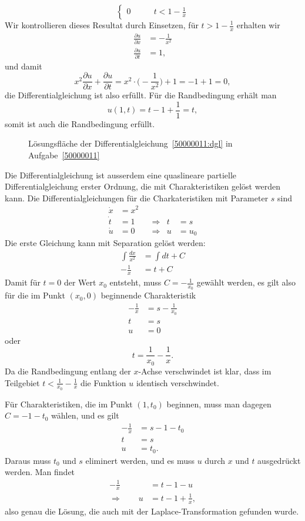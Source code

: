 \begin{loesung}
\[\begin{cases}
0
&\qquad t < 1-\frac1x
\end{cases}
\]
Wir kontrollieren dieses Resultat durch Einsetzen, für $t>1-\frac1x$
erhalten wir
\begin{align*}
\frac{\partial u}{\partial x}
&=-\frac1{x^2}
\\
\frac{\partial u}{\partial t}
&=1,
\end{align*}
und damit
\[
x^2\frac{\partial u}{\partial x}+\frac{\partial u}{\partial t}
=
x^2\cdot \biggl(-\frac1{x^2}\biggr) + 1 = -1 + 1=0,
\]
die Differentialgleichung ist also erfüllt.
Für die Randbedingung erhält man
\[
u(1,t)=t-1+\frac11=t,
\]
somit ist auch die Randbedingung erfüllt.
\begin{figure}
\centering
{}
\caption{Lösungsfläche der Differentialgleichung~\eqref{50000011:dgl}
in Aufgabe~\ref{50000011}
\label{50000011:graph}}
\end{figure}
\end{loesung}

\begin{diskussion}
Die Differentialgleichung ist ausserdem eine quaslineare partielle
Differentialgleichung erster Ordnung, die mit Charakteristiken gelöst
werden kann.
Die Differentialgleichungen für die Charkateristiken mit Parameter $s$
sind 
\[
\begin{aligned}
\dot x&=x^2 &&       &   &     \\
\dot t&=1   &&\Rightarrow& t &= s  \\
\dot u&=0   &&\Rightarrow& u &= u_0
\end{aligned}
\]
Die erste Gleichung kann mit Separation gelöst werden:
\begin{align*}
\int \frac{dx}{x^2}
&=
\int dt+C
\\
-\frac1x
&=
t+C
\end{align*}
Damit für $t=0$ der Wert $x_0$ entsteht, muss $C=-\frac1{x_0}$
gewählt werden, es gilt also für die im Punkt $(x_0,0)$ beginnende
Charakteristik 
\begin{align*}
-\frac1x&=s-\frac1{x_0}\\
       t&=s\\
       u&=0
\end{align*}
oder
\[
t= \frac1{x_0} - \frac1x.
\]
Da die Randbedingung entlang der $x$-Achse verschwindet ist
klar, dass im Teilgebiet $t<\frac1{x_0}-\frac1x$
die Funktion $u$ identisch verschwindet.

Für Charakteristiken, die im Punkt $(1,t_0)$ beginnen, muss man dagegen
$C=-1-t_0$ wählen, und es gilt
\begin{align*}
-\frac1x&=s-1-t_0\\
       t&=s      \\
       u&=t_0.
\end{align*}
Daraus muss $t_0$ und $s$ eliminert werden, und es muss $u$ durch $x$ und $t$
ausgedrückt werden.
Man findet
\begin{align*}
-\frac1x&=t-1-u
\\
\Rightarrow\qquad
u&=t-1+\frac1x,
\end{align*}
also genau die Lösung, die auch mit der Laplace-Transformation gefunden wurde.
\end{diskussion}

